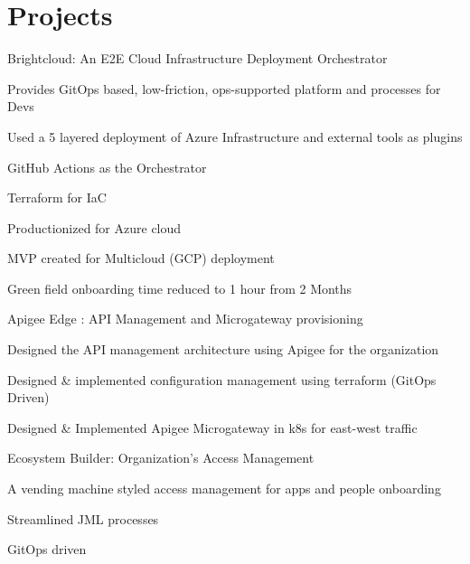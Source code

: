 \documentclass[]{de-resume}
\begin{document}
\begin{minipage}[t]{0.66\textwidth} 


\section{Projects}
\subsectionsep
{}
\subsectionsep
\begin{tightemize}
\item Brightcloud: An E2E Cloud Infrastructure Deployment Orchestrator
	\begin{tightemize}
		\sectionsep
		\item Provides GitOps based, low-friction, ops-supported platform and processes for Devs
		\item Used a 5 layered deployment of Azure Infrastructure and external tools as plugins
		\item GitHub Actions as the Orchestrator
		\item Terraform for IaC 
		\item Productionized for Azure cloud
		\item MVP created for Multicloud (GCP) deployment 
		\item Green field onboarding time reduced to 1 hour from 2 Months
		\sectionsep
	\end{tightemize}

\item Apigee Edge : API Management and Microgateway provisioning 
\begin{tightemize}
	\sectionsep
	\item Designed the API management architecture using Apigee for the organization
	\item Designed \& implemented configuration management using terraform (GitOps Driven)
	\item Designed \& Implemented Apigee Microgateway in k8s for east-west traffic
	\sectionsep
\end{tightemize}

\item Ecosystem Builder: Organization's Access Management
\begin{tightemize}
	\sectionsep
	\item A vending machine styled access management for apps and people onboarding
	\item Streamlined JML processes 
	\item GitOps driven
	\sectionsep
\end{tightemize}


\end{tightemize}
\end{minipage}
\end{document}
